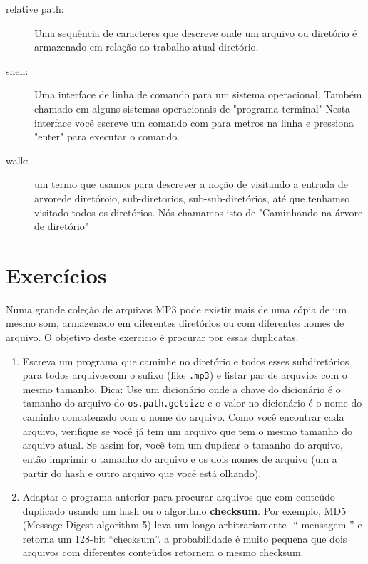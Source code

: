 \begin{description}
\item[relative path:] Uma sequência de caracteres que descreve onde um arquivo ou
diretório é armazenado em relação ao trabalho atual diretório.

\item[shell:] Uma interface de linha de comando para um sistema operacional.
Também chamado em alguns sistemas operacionais de "programa terminal"
Nesta interface você escreve um comando com para metros na linha e pressiona "enter" 
para executar o comando.

\item[walk:] um termo que usamos para descrever  a noção de visitando
a entrada de arvorede diretóroio, sub-diretorios, sub-sub-diretórios,
até que tenhamso visitado todos os diretórios. 
Nós chamamos isto  de "Caminhando na árvore de diretório"

\end{description}

\section{Exercícios}


\label{checksum}


Numa grande coleção de arquivos MP3 pode existir mais de uma 
cópia de um mesmo som, armazenado em diferentes diretórios ou com 
diferentes nomes de arquivo. O objetivo deste exercicio é 
procurar por essas duplicatas.

\begin{enumerate}

\item Escreva um programa que caminhe no diretório e todos esses
subdiretórios para todos arquivoscom o sufixo (like {\tt .mp3})
e listar par de arquvios com o mesmo tamanho.
Dica: Use um dicionário onde a chave do dicionário é o tamanho
do arquivo do {\tt os.path.getsize} e o valor no
dicionário é o nome do caminho concatenado com o nome do arquivo.
Como você encontrar cada arquivo, verifique se você já tem um
arquivo que tem o mesmo tamanho do arquivo atual. Se assim for, você tem um
duplicar o tamanho do arquivo, então imprimir o tamanho do arquivo e os dois nomes de arquivo
(um a partir do hash e outro arquivo que você está olhando).


\item Adaptar o programa anterior para procurar arquivos que
com conteúdo duplicado usando um hash ou o algoritmo {\bf checksum}. Por exemplo,
MD5 (Message-Digest algorithm 5) leva um longo arbitrariamente-
`` mensagem '' e retorna um 128-bit ``checksum''. a probabilidade
é muito pequena que dois arquivos com diferentes conteúdos
retornem o mesmo checksum.

\end{enumerate}

